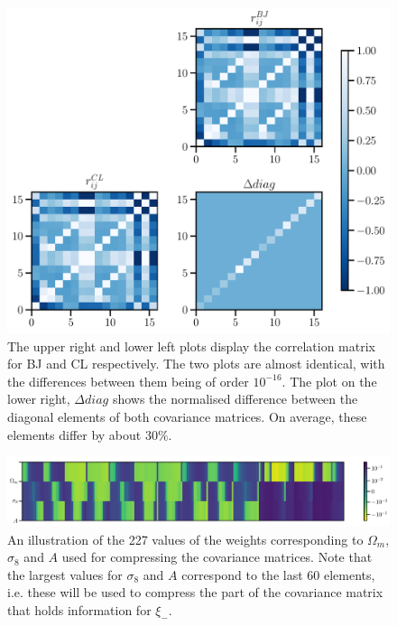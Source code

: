 \documentclass[twocolumn]{\docclass}
\begin{document}
	\begin{figure}
		\includegraphics[width=0.9\columnwidth]{Correlation_compressed3.pdf}
		\caption{The upper right and lower left plots display the correlation matrix for BJ and CL respectively. The two plots are almost identical, with the differences between them being of order $10^{-16}$. The plot on the lower right, $\Delta diag$ shows the normalised difference between the diagonal elements of both covariance matrices. On average, these elements differ by about $30\%$. \label{fig:correlation}}
	\end{figure}
	
	\begin{figure}
		\includegraphics[width=2\columnwidth]{Weights.pdf}
		\caption{An illustration of the 227 values of the weights corresponding to $\Omega_m$, $\sigma_8$ and $A$ used for compressing the covariance matrices. Note that the largest values for $\sigma_8$ and $A$ correspond to the last 60 elements, i.e. these will be used to compress the part of the covariance matrix that holds information for $\xi_-$.} \label{fig:weight2pt}
	\end{figure}
	
	
	
\end{document}
